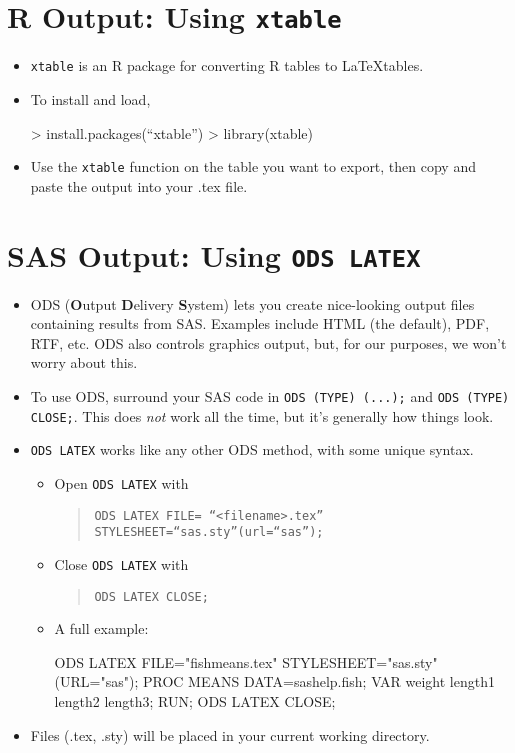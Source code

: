 \documentclass{article}
\begin{document}
	\section{R Output: Using \texttt{xtable}}
	\begin{itemize}
		\item \texttt{xtable} is an R package for converting R tables to \LaTeX tables.
		\item To install and load, 
		\begin{Rcode*}
> install.packages(``xtable'')
> library(xtable)
		\end{Rcode*}
		\item Use the \texttt{xtable} function on the table you want to export, then copy and paste the output into your .tex file.
	\end{itemize}
	
	
	\section{SAS Output: Using \texttt{ODS LATEX}}
	\begin{itemize}
		\item ODS (\textbf{O}utput \textbf{D}elivery \textbf{S}ystem) lets you create nice-looking output files containing results from SAS. Examples include HTML (the default), PDF, RTF, etc. ODS also controls graphics output, but, for our purposes, we won't worry about this.
		\item To use ODS, surround your SAS code in \texttt{ODS (TYPE) (...);} and \texttt{ODS (TYPE) CLOSE;}. This does \textit{not} work all the time, but it's generally how things look.
		\item \texttt{ODS LATEX} works like any other ODS method, with some unique syntax.
		\begin{itemize}
			\item Open \texttt{ODS LATEX} with
			\begin{quote}
				\texttt{ODS LATEX FILE= ``<\textit{filename}>.tex'' STYLESHEET=``sas.sty''(url=``sas'');} 
			\end{quote}
			\item Close \texttt{ODS LATEX} with 
			\begin{quote}
				\texttt{ODS LATEX CLOSE;}
			\end{quote}
			\item A full example:
			\begin{SAScode*}
ODS LATEX FILE="fishmeans.tex" STYLESHEET="sas.sty"(URL="sas");
PROC MEANS DATA=sashelp.fish;
	VAR weight length1 length2 length3;
RUN;
ODS LATEX CLOSE;
			\end{SAScode*}
		\end{itemize}
		\item Files (.tex, .sty) will be placed in your current working directory.
	\end{itemize}
	
\end{document}
